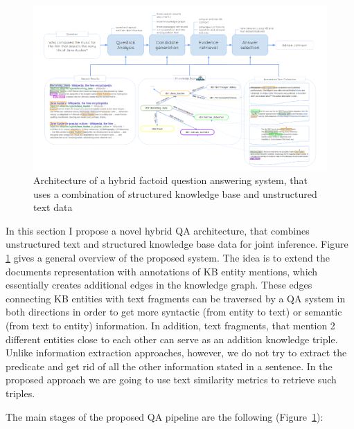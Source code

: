 \begin{figure}
\centering
\includegraphics[width=\textwidth]{img/text_and_kb}
\caption{Architecture of a hybrid factoid question answering system, that uses a combination of structured knowledge base and unstructured text data}
\label{figure:factoid:text_kb}
\end{figure}

In this section I propose a novel hybrid QA architecture, that combines unstructured text and structured knowledge base data for joint inference.
Figure \ref{figure:factoid:text_kb} gives a general overview of the proposed system. The idea is to extend the documents representation with annotations of KB entity mentions, which essentially creates additional edges in the knowledge graph.
These edges connecting KB entities with text fragments can be traversed by a QA system in both directions in order to get more syntactic (from entity to text) or semantic (from text to entity) information.
In addition, text fragments, that mention 2 different entities close to each other can serve as an addition knowledge triple.
Unlike information extraction approaches, however, we do not try to extract the predicate and get rid of all the other information stated in a sentence.
In the proposed approach we are going to use text similarity metrics to retrieve such triples.

The main stages of the proposed QA pipeline are the following (Figure~\ref{figure:factoid:text_kb}):

